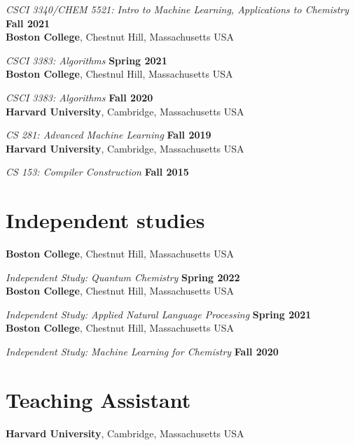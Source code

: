 \documentclass[margin,line]{res}
\begin{document}
\begin{resume}
{\em CSCI 3340/CHEM 5521: Intro to Machine Learning, Applications to Chemistry} \hfill {\bf Fall 2021}\\
{\bf Boston College}, Chestnut Hill, Massachusetts USA
\vspace{-.4cm}

{\em CSCI 3383: Algorithms} \hfill {\bf Spring 2021}\\
{\bf Boston College}, Chestnul Hill, Massachusetts USA
\vspace{-.4cm}

{\em CSCI 3383: Algorithms} \hfill {\bf Fall 2020}\\
{\bf Harvard University}, Cambridge, Massachusetts USA
\vspace{-.4cm}

{\em CS 281: Advanced Machine Learning} \hfill {\bf Fall 2019}\\
{\bf Harvard University}, Cambridge, Massachusetts USA
\vspace{-.4cm}

{\em CS 153: Compiler Construction} \hfill {\bf Fall 2015}\\


\section{\sc Independent studies}

{\bf Boston College}, Chestnut Hill, Massachusetts USA
\vspace{-.4cm}

{\em Independent Study: Quantum Chemistry} \hfill {\bf Spring 2022}\\
{\bf Boston College}, Chestnut Hill, Massachusetts USA
\vspace{-.4cm}

{\em Independent Study: Applied Natural Language Processing} \hfill {\bf Spring 2021}\\
{\bf Boston College}, Chestnut Hill, Massachusetts USA
\vspace{-.4cm}

{\em Independent Study: Machine Learning for Chemistry} \hfill {\bf Fall 2020}\\

\section{\sc Teaching Assistant}

{\bf Harvard University}, Cambridge, Massachusetts USA
\vspace{-.4cm}


\end{resume}
\end{document}
